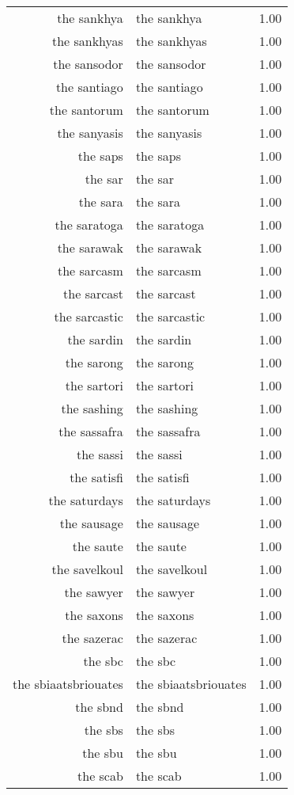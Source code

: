 \begin{table}[ht]
\begin{tabular}{rlr}
  the sankhya & the sankhya & 1.00 \\ 
  the sankhyas & the sankhyas & 1.00 \\ 
  the sansodor & the sansodor & 1.00 \\ 
  the santiago & the santiago & 1.00 \\ 
  the santorum & the santorum & 1.00 \\ 
  the sanyasis & the sanyasis & 1.00 \\ 
  the saps & the saps & 1.00 \\ 
  the sar & the sar & 1.00 \\ 
  the sara & the sara & 1.00 \\ 
  the saratoga & the saratoga & 1.00 \\ 
  the sarawak & the sarawak & 1.00 \\ 
  the sarcasm & the sarcasm & 1.00 \\ 
  the sarcast & the sarcast & 1.00 \\ 
  the sarcastic & the sarcastic & 1.00 \\ 
  the sardin & the sardin & 1.00 \\ 
  the sarong & the sarong & 1.00 \\ 
  the sartori & the sartori & 1.00 \\ 
  the sashing & the sashing & 1.00 \\ 
  the sassafra & the sassafra & 1.00 \\ 
  the sassi & the sassi & 1.00 \\ 
  the satisfi & the satisfi & 1.00 \\ 
  the saturdays & the saturdays & 1.00 \\ 
  the sausage & the sausage & 1.00 \\ 
  the saute & the saute & 1.00 \\ 
  the savelkoul & the savelkoul & 1.00 \\ 
  the sawyer & the sawyer & 1.00 \\ 
  the saxons & the saxons & 1.00 \\ 
  the sazerac & the sazerac & 1.00 \\ 
  the sbc & the sbc & 1.00 \\ 
  the sbiaatsbriouates & the sbiaatsbriouates & 1.00 \\ 
  the sbnd & the sbnd & 1.00 \\ 
  the sbs & the sbs & 1.00 \\ 
  the sbu & the sbu & 1.00 \\ 
  the scab & the scab & 1.00 \\ 

\end{tabular}
\end{table}
